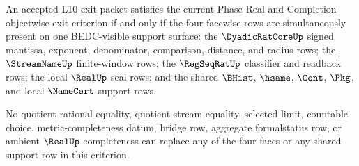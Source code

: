 \begin{theorem}
\label{thm:dyadicratcore-phase-real-completion-objectwise-exit-equivalence}
An accepted L10 exit packet satisfies the current Phase Real and Completion objectwise exit criterion if and only if the four facewise rows are simultaneously present on one BEDC-visible support surface: the $\DyadicRatCoreUp$ signed mantissa, exponent, denominator, comparison, distance, and radius rows; the $\StreamNameUp$ finite-window rows; the $\RegSeqRatUp$ classifier and readback rows; the local $\RealUp$ seal rows; and the shared $\BHist$, $\hsame$, $\Cont$, $\Pkg$, and local $\NameCert$ support rows.

No quotient rational equality, quotient stream equality, selected limit, countable choice, metric-completeness datum, bridge row, aggregate formalstatus row, or ambient $\RealUp$ completeness can replace any of the four faces or any shared support row in this criterion.
\end{theorem}
